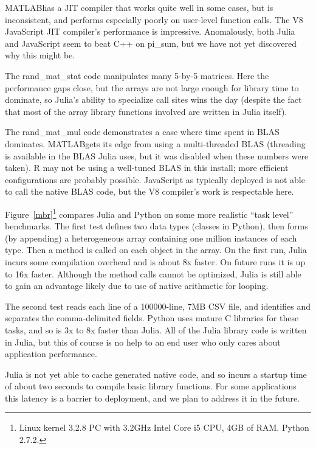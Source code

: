 \documentclass[9pt]{sigplanconf}
\newcommand{\Matlab}{MATLAB\textsuperscript{\tiny\textregistered}}
\begin{document}
\Matlab has a JIT compiler
that works quite well in some cases, but is inconsistent, and
performs especially poorly on user-level function calls. The V8
JavaScript JIT compiler's performance is impressive. Anomalously, both
Julia and JavaScript seem to beat C++ on pi\_sum, but we have not yet
discovered why this might be.

The rand\_mat\_stat code manipulates many 5-by-5 matrices. Here the
performance gaps close, but the arrays are not large enough for
library time to dominate, so Julia's ability to specialize call sites
wins the day (despite the fact that most of the array library functions
involved are written in Julia itself).

The rand\_mat\_mul code demonstrates a case where time spent in BLAS \cite{blas}
dominates. \Matlab gets its edge from using a
multi-threaded BLAS (threading is available in the BLAS Julia uses,
but it was disabled when these numbers were taken). R may not be using
a well-tuned BLAS in this install; more efficient configurations are
probably possible.
JavaScript as typically deployed is not able to call the native BLAS code,
but the V8 compiler's work is respectable here.

Figure~\ref{mbr}\footnote{
Linux kernel 3.2.8 PC with 3.2GHz Intel Core i5 CPU, 4GB of RAM.
Python 2.7.2.} compares Julia and Python on some
more realistic ``task level'' benchmarks. The first test defines two
data types (classes in Python), then forms (by appending) a heterogeneous
array containing one million instances of each type. Then a method is called
on each object in the array. On the first run, Julia incurs some compilation
overhead and is about 8x faster. On future runs it is up to 16x faster.
Although the method calls cannot be optimized, Julia is still able to
gain an advantage likely due to use of native arithmetic for looping.

The second test reads each line of a 100000-line, 7MB CSV file, and
identifies and separates the comma-delimited fields. Python uses mature
C libraries for these tasks, and so is 3x to 8x faster than Julia. All of
the Julia library code is written in Julia, but this of course is no help
to an end user who only cares about application performance.

Julia is not yet able to cache generated native code, and so incurs a
startup time of about two seconds to compile basic library functions.
For some applications this latency is a barrier to deployment, and we plan
to address it in the future.
\end{document}
